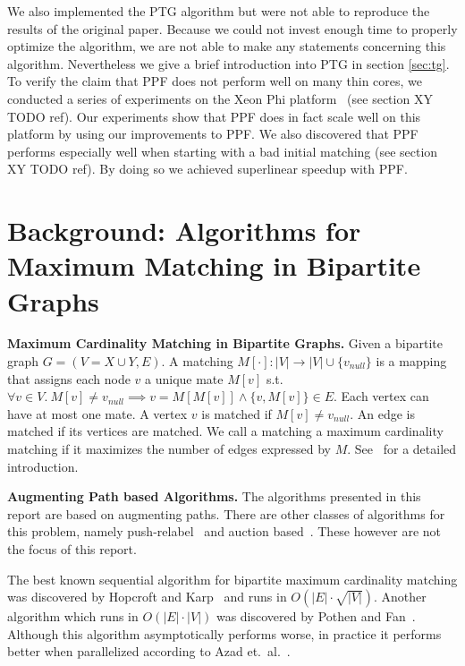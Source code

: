 \documentclass[letterpaper]{article}
\newcommand{\mypar}[1]{{\bf #1.}}
\begin{document}
We also implemented the PTG algorithm but were not able to reproduce the results of the original paper. 
Because we could not invest enough time to properly optimize the algorithm, we are not able to make any statements concerning this algorithm.
Nevertheless we give a brief introduction into PTG in section \ref{sec:tg}.\\

To verify the claim that PPF does not perform well on many thin cores, we conducted a series of experiments on the Xeon Phi platform~\cite{XeonPhi} (see section XY TODO ref). 
Our experiments show that PPF does in fact scale well on this platform by using our improvements to PPF. We also discovered that PPF
performs especially well when starting with a bad initial matching (see section XY TODO ref). 
By doing so we achieved superlinear speedup with PPF.

\section{Background: Algorithms for Maximum Matching in Bipartite Graphs}\label{sec:background}

\mypar{Maximum Cardinality Matching in Bipartite Graphs}
Given a bipartite graph $G = (V = X \cup Y, E)$.
A matching $M[\cdot]: |V| \rightarrow |V| \cup \{v_{null}\}$ is a mapping that assigns each node $v$ a unique mate $M[v]$ s.t. 
$\forall v \in V.\ M[v] \neq v_{null} \implies v = M[M[v]] \wedge \{v, M[v]\} \in E$.
Each vertex can have at most one mate. A vertex $v$ is matched if $M[v] \neq v_{null}$. An edge is matched if its vertices are matched. 
We call a matching a maximum cardinality matching if it maximizes the number of edges expressed by $M$. See~\cite{intro_alg} for a detailed introduction.

\mypar{Augmenting Path based Algorithms}
The algorithms presented in this report are based on augmenting paths. 
There are other classes of algorithms for this problem, namely push-relabel~\cite{GoldbergT88} and auction based~\cite{Bertsekas}. 
These however are not the focus of this report. 

The best known sequential algorithm for bipartite maximum cardinality matching was discovered by Hopcroft and Karp~\cite{HK:1973}
and runs in $O(|E|\cdot \sqrt{|V|})$. Another algorithm which runs in $O(|E|\cdot|V|)$ was discovered by Pothen and Fan~\cite{Pothen:1990}.
Although this algorithm asymptotically performs worse, in practice it performs better when parallelized according to Azad et.\ al.~\cite{Azad:2012}.
\end{document}
